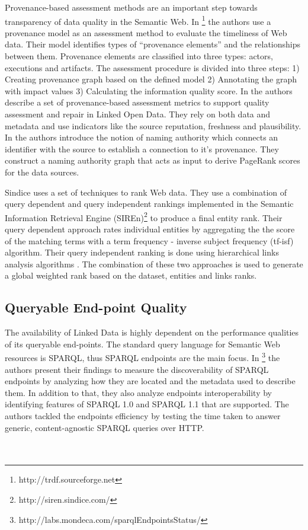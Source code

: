 \documentclass[onecolumn, crcready]{iosart2c}
\begin{document}

Provenance-based assessment methods are an important step towards transparency of data quality in the Semantic Web. In \cite{Hartig09usingweb}\footnote{http://trdf.sourceforge.net} the authors use a provenance model as an assessment method to evaluate the timeliness of Web data. Their model identifies types of ``provenance elements'' and the relationships between them. Provenance elements are classified into three types: actors, executions and artifacts. The assessment procedure is divided into three steps: 1) Creating provenance graph based on the defined model 2) Annotating the graph with impact values 3) Calculating the information quality score. In \cite{Flouris2012} the authors describe a set of provenance-based assessment metrics to support quality assessment and repair in Linked Open Data. They rely on both data and metadata and use indicators like the source reputation, freshness and plausibility. In \cite{Harth2009} the authors introduce the notion of naming authority which connects an identifier with the source to establish a connection to it's provenance. They construct a naming authority graph that acts as input to derive PageRank scores for the data sources.\\


Sindice \cite{Delbru2010} uses a set of techniques to rank Web data. They use a combination of query dependent and query independent rankings implemented in the Semantic Information Retrieval Engine (SIREn)\footnote{http://siren.sindice.com/} to produce a final entity rank. Their query dependent approach rates individual entities by aggregating the the score of the matching terms with a term frequency - inverse subject frequency (tf-isf) algorithm. Their query independent ranking is done using hierarchical links analysis algorithms \cite{Delbru2010a}. The combination of these two approaches is used to generate a global weighted rank based on the dataset, entities and links ranks.\\

\subsection{Queryable End-point Quality}

The availability of Linked Data is highly dependent on the performance qualities of its queryable end-points. The standard query language for Semantic Web resources is SPARQL, thus SPARQL endpoints are the main focus. In \cite{Buil-Aranda2013}\footnote{http://labs.mondeca.com/sparqlEndpointsStatus/} the authors present their findings to measure the discoverability of SPARQL endpoints by analyzing how they are located and the metadata used to describe them. In addition to that, they also analyze endpoints interoperability by identifying features of SPARQL 1.0 and SPARQL 1.1 that are supported. The authors tackled the endpoints efficiency by testing the time taken to answer generic, content-agnostic SPARQL queries over HTTP.\\\\\\
\end{document}
